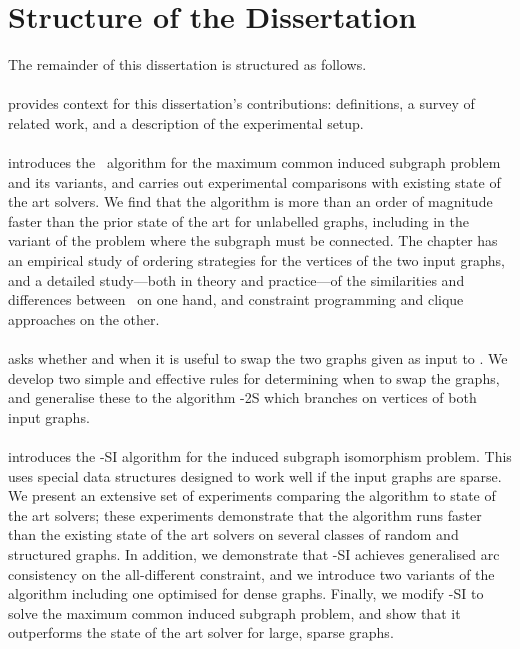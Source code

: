 \section{Structure of the Dissertation}

The remainder of this dissertation is structured as follows.

\paragraph*{} provides context for this dissertation's
contributions: definitions, a survey of related work, and a description of the
experimental setup.

\paragraph*{} introduces the \McSplit\
algorithm for the maximum common induced subgraph problem and its variants, and
carries out experimental comparisons with existing state of the art solvers.
We find that the algorithm is more than an order of magnitude faster than the prior
state of the art for unlabelled graphs, including in the variant of the problem
where the subgraph must be connected.
The chapter has an empirical study of ordering strategies for the vertices
of the two input graphs, and a detailed study---both in theory and practice---of
the similarities and differences
between \McSplit\ on one hand, and constraint programming and clique approaches
on the other.


\paragraph*{} asks whether and when it is
useful to swap the two graphs given as input to \McSplit.  We develop two
simple and effective rules for determining when to swap the graphs, and
generalise these to the algorithm \McSplit-2S which branches on vertices of
both input graphs.

\paragraph*{} introduces the \McSplit-SI algorithm for the
induced subgraph isomorphism problem.  This uses
special data structures designed to work well if the input graphs are sparse.
We present an extensive set of experiments comparing the algorithm to state of
the art solvers; these experiments demonstrate that the algorithm runs faster than the
existing state of the art solvers on several classes of random and structured
graphs.
In addition, we demonstrate that \McSplit-SI achieves generalised arc consistency
on the all-different constraint, and we introduce two variants of the algorithm
including one optimised for dense graphs.
Finally, we modify \McSplit-SI to solve the maximum common
induced subgraph problem, and show that it outperforms the state of the art
solver for large, sparse graphs.

